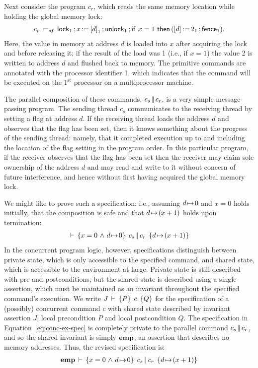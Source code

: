 \documentclass[11pt]{report}
\begin{document}
Next consider the program $c_r$, which reads the same memory location while holding the global memory lock: \[ c_r \operatorname{\;=_{\mathit{df}}\;} \operatorname{\mathsf{lock}}_1 \operatorname{;} x \operatorname{:\!=} \left[ d \right]_1 \operatorname{;} \operatorname{\mathsf{unlock}}_1 \operatorname{;} \operatorname{\mathsf{if\,}} x = 1 \operatorname{\mathsf{\,then\,}} (\left[ d \right] \operatorname{:\!=} 2_1 \operatorname{;} \operatorname{\mathsf{fence}}_1).\] Here, the value in memory at address $d$ is loaded into $x$ after acquiring the lock and before releasing it; if the result of the load was 1 (i.e., if $x = 1$) the value 2 is written to address $d$ and flushed back to memory. The primitive commands are annotated with the processor identifier 1, which indicates that the command will be executed on the $1^{\mathrm{st}}$ processor on a multiprocessor machine. 

The parallel composition of these commands, $c_s \operatorname{|\!|} c_r$, is a very simple message-passing program. The sending thread $c_s$ communicates to the receiving thread by setting a flag at address $d$. If the receiving thread loads the address $d$ and observes that the flag has been set, then it knows something about the progress of the sending thread: namely, that it completed execution up to and including the location of the flag setting in the program order. In this particular program, if the receiver observes that the flag has been set then the receiver may claim sole ownership of the address $d$ and may read and write to it without concern of future interference, and hence without first having acquired the global memory lock.

We might like to prove such a specification: i.e., assuming $d \!\mapsto\! 0$ and $x = 0$ holds initially, that the composition is safe and that $d \!\mapsto\! (x+1)$ holds upon termination: \begin{align}
\label{eq:conc-ex-spec} \,\vdash\,\left\lbrace x = 0 \operatorname{\,\wedge\,} d \!\mapsto\! 0 \right\rbrace\;c_s \operatorname{|\!|} c_r\;\left\lbrace d \!\mapsto\! (x+1) \right\rbrace\end{align} In the concurrent program logic, however, specifications distinguish between private state, which is only accessible to the specified command, and shared state, which is accessible to the environment at large. Private state is still described with pre and postconditions, but the shared state is described using a single assertion, which must be maintained as an invariant throughout the specified command's execution. We write $J\,\vdash\,\left\lbrace P \right\rbrace\;c\;\left\lbrace Q \right\rbrace$ for the specification of a (possibly) concurrent command $c$ with shared state described by invariant assertion $J$, local precondition $P$ and local postcondition $Q$. The specification in Equation~\ref{eq:conc-ex-spec} is completely private to the parallel command $c_s \operatorname{|\!|} c_r$, and so the shared invariant is simply $\mathbf{emp}$, an assertion that describes no memory addresses. Thus, the revised specification is: \begin{align}\label{eq:conc-ex-spec-rev} \mathbf{emp}\,\vdash\,\left\lbrace x = 0 \operatorname{\,\wedge\,} d \!\mapsto\! 0 \right\rbrace\;c_s \operatorname{|\!|} c_r\;\left\lbrace d \!\mapsto\! (x+1) \right\rbrace\end{align}
\end{document}
